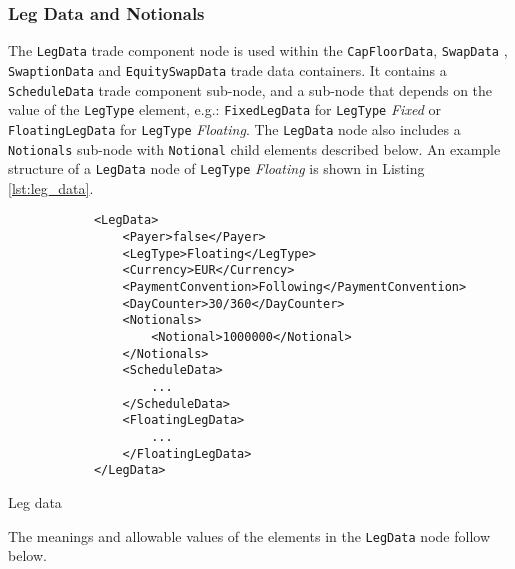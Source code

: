 \subsubsection{Leg Data and Notionals}
\label{ss:leg_data}

The \lstinline!LegData! trade component node is used within the
\lstinline!CapFloorData!,  \lstinline!SwapData! ,
\lstinline!SwaptionData! and \lstinline!EquitySwapData! trade data containers. It contains a
\lstinline!ScheduleData! trade component sub-node, and a sub-node that depends on
the value of the \lstinline!LegType! element, e.g.:  \lstinline!FixedLegData! for \lstinline!LegType! \emph{Fixed} or \lstinline!FloatingLegData! for \lstinline!LegType! \emph{Floating}. The
\lstinline!LegData! node also includes a \lstinline!Notionals!
sub-node  with \lstinline!Notional! child elements described below. An
example structure of a \lstinline!LegData! node of \lstinline!LegType!
\emph{Floating} is shown in Listing \ref{lst:leg_data}.

\begin{listing}[H]
\begin{verbatim}
            <LegData>
                <Payer>false</Payer>
                <LegType>Floating</LegType>
                <Currency>EUR</Currency>
                <PaymentConvention>Following</PaymentConvention>
                <DayCounter>30/360</DayCounter>
                <Notionals>
                    <Notional>1000000</Notional>
                </Notionals>
                <ScheduleData>
                    ...
                </ScheduleData>
                <FloatingLegData>
                    ...
                </FloatingLegData>
            </LegData>
\end{verbatim}
\caption{Leg data}
\label{lst:leg_data}
\end{listing}

The meanings and allowable values of the elements in the \lstinline!LegData! node follow below.

